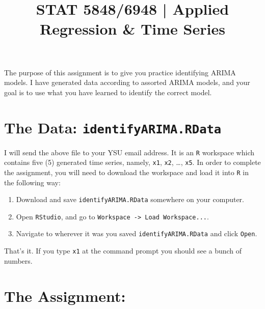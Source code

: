 \documentclass[12pt,english]{article}
\title{STAT 5848/6948 | Applied Regression \& Time Series}
\date{\vspace{-0.5in}}
\begin{document}
\maketitle

\thispagestyle{empty}

The purpose of this assignment is to give you practice identifying ARIMA models.  I have generated data according to assorted ARIMA models, and your goal is to use what you have learned to identify the correct model.

\section*{The Data: \texttt{identifyARIMA.RData}}
\label{sec-1}


I will send the above file to your YSU email address. It is an \texttt{R} workspace which contains five (5) generated time series, namely, \texttt{x1}, \texttt{x2}, \ldots{}, \texttt{x5}.  In order to complete the assignment, you will need to download the workspace and load it into \texttt{R} in the following way:
\begin{enumerate}
\item Download and save \texttt{identifyARIMA.RData} somewhere on your computer.
\item Open \texttt{RStudio}, and go to \texttt{Workspace -> Load Workspace...}.
\item Navigate to wherever it was you saved \texttt{identifyARIMA.RData} and click \texttt{Open}.
\end{enumerate}
That's it.  If you type \texttt{x1} at the command prompt you should see a bunch of numbers.
\section*{The Assignment:}
\label{sec-2}
\end{document}
